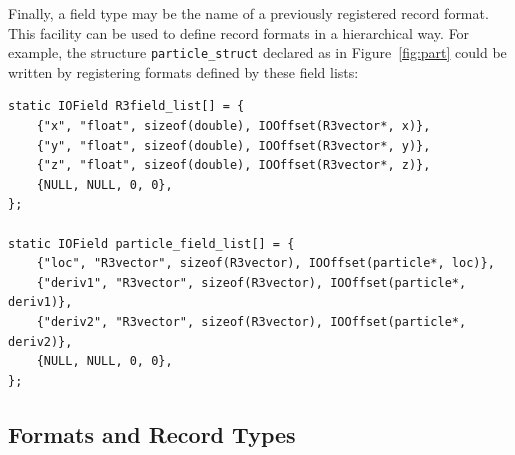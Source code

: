 Finally, a field type may be the name of a previously registered record
format.  This facility can be used to define record formats in a hierarchical
way.  For example, the structure {\tt particle\_struct} declared as in
Figure~\ref{fig:part} could be written by registering formats defined by these
field lists:
\begin{verbatim}
static IOField R3field_list[] = {
    {"x", "float", sizeof(double), IOOffset(R3vector*, x)},
    {"y", "float", sizeof(double), IOOffset(R3vector*, y)},
    {"z", "float", sizeof(double), IOOffset(R3vector*, z)},
    {NULL, NULL, 0, 0},
};

static IOField particle_field_list[] = {
    {"loc", "R3vector", sizeof(R3vector), IOOffset(particle*, loc)},
    {"deriv1", "R3vector", sizeof(R3vector), IOOffset(particle*, deriv1)},
    {"deriv2", "R3vector", sizeof(R3vector), IOOffset(particle*, deriv2)},
    {NULL, NULL, 0, 0},
};
\end{verbatim}


\subsection{Formats and Record Types}

